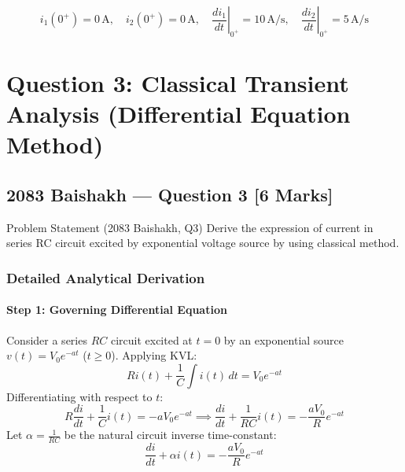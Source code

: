 \documentclass[11pt,a4paper,oneside]{article}
\begin{document}
\begin{answerbox}
\[
i_1(0^+) = 0\,\mathrm{A}, \quad i_2(0^+) = 0\,\mathrm{A}, \quad \left.\frac{di_1}{dt}\right|_{0^+} = 10\,\mathrm{A/s}, \quad \left.\frac{di_2}{dt}\right|_{0^+} = 5\,\mathrm{A/s}
\]
\end{answerbox}

\newpage

\section{Question 3: Classical Transient Analysis (Differential Equation Method)}

\subsection{2083 Baishakh --- Question 3 [6 Marks]}

\begin{questionbox}{Problem Statement (2083 Baishakh, Q3)}
Derive the expression of current in series RC circuit excited by exponential voltage source by using classical method.
\end{questionbox}

\subsubsection*{Detailed Analytical Derivation}

\paragraph{Step 1: Governing Differential Equation}
Consider a series $RC$ circuit excited at $t=0$ by an exponential source $v(t) = V_0 e^{-at}$ ($t \ge 0$). Applying KVL:
\begin{equation}
  R i(t) + \frac{1}{C} \int i(t)\,dt = V_0 e^{-at}
\end{equation}
Differentiating with respect to $t$:
\begin{equation}
  R \frac{di}{dt} + \frac{1}{C} i(t) = -a V_0 e^{-at} \implies \frac{di}{dt} + \frac{1}{RC} i(t) = -\frac{a V_0}{R} e^{-at}
\end{equation}
Let $\alpha = \frac{1}{RC}$ be the natural circuit inverse time-constant:
\begin{equation}
  \frac{di}{dt} + \alpha i(t) = -\frac{a V_0}{R} e^{-at}
\end{equation}
\end{document}
